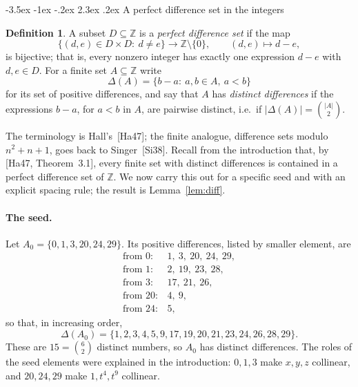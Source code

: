\documentclass[11pt]{article}
\makeatletter
\renewcommand\section{\@startsection{section}{1}{\z@}
  {-3.5ex \@plus -1ex \@minus -.2ex}
  {2.3ex \@plus.2ex}
  {\normalfont\bfseries}}
\theoremstyle{plain}
\theoremstyle{definition}
\newtheorem{definition}[theorem]{Definition}
\newcommand{\Z}{\mathbb{Z}}
\makeatother
\begin{document}
\section{A perfect difference set in the integers}\label{sec:diffset}

\begin{definition}\label{def:pds}
A subset $D\subseteq\Z$ is a \emph{perfect difference set} if the map
\[
 \{(d,e)\in D\times D:\ d\neq e\}\longrightarrow\Z\setminus\{0\},
 \qquad (d,e)\longmapsto d-e,
\]
is bijective; that is, every nonzero integer has exactly one expression
$d-e$ with $d,e\in D$.  For a finite set $A\subseteq\Z$ write
\[
 \Delta(A)=\{b-a:\ a,b\in A,\ a<b\}
\]
for its set of positive differences, and say that $A$ has
\emph{distinct differences} if the expressions $b-a$, for $a<b$ in $A$,
are pairwise distinct, i.e.\ if $|\Delta(A)|=\binom{|A|}{2}$.
\end{definition}

The terminology is Hall's~[Ha47]; the finite analogue, difference sets
modulo $n^2+n+1$, goes back to Singer~[Si38].  Recall from the
introduction that, by [Ha47, Theorem~3.1], every finite set with
distinct differences is contained in a perfect difference set of $\Z$.
We now carry this out for a specific seed and with an explicit spacing
rule; the result is Lemma~\ref{lem:diff}.

\paragraph{The seed.}
Let $A_0=\{0,1,3,20,24,29\}$.  Its positive differences, listed by
smaller element, are
\[
 \begin{array}{ll}
 \text{from }0:& 1,\ 3,\ 20,\ 24,\ 29,\\
 \text{from }1:& 2,\ 19,\ 23,\ 28,\\
 \text{from }3:& 17,\ 21,\ 26,\\
 \text{from }20:& 4,\ 9,\\
 \text{from }24:& 5,
 \end{array}
\]
so that, in increasing order,
\[
 \Delta(A_0)=\{1,2,3,4,5,9,17,19,20,21,23,24,26,28,29\}.
\]
These are $15=\binom62$ distinct numbers, so $A_0$ has distinct
differences.  The roles of the seed elements were explained in the
introduction: $0,1,3$ make $x,y,z$ collinear, and $20,24,29$ make
$1,t^4,t^9$ collinear.
\end{document}
